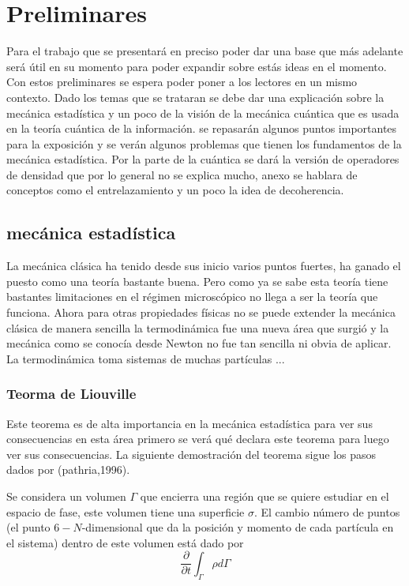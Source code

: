 \chapter{Preliminares}

Para el trabajo que se presentará en preciso poder dar una base que más adelante será útil  en su momento para poder expandir sobre estás ideas en el momento. Con estos preliminares se espera poder poner a los lectores en un mismo contexto. Dado los temas que se trataran se debe dar una explicación sobre la mecánica estadística y un poco de la visión de la mecánica cuántica que es usada en la teoría cuántica de la información. se repasarán algunos puntos importantes para la exposición y se verán algunos problemas que tienen los fundamentos de la mecánica estadística. Por la parte de la cuántica se dará la versión de operadores de densidad  que por lo general no se explica mucho, anexo se hablara de conceptos como el entrelazamiento y un poco la idea de decoherencia.

\section{mecánica estadística}
La mecánica clásica ha tenido desde sus inicio varios puntos fuertes, ha ganado el puesto como una teoría bastante buena. Pero como ya se sabe esta teoría tiene bastantes limitaciones en el régimen microscópico no llega a ser la teoría que funciona. Ahora para otras propiedades físicas no se puede extender la mecánica clásica de manera sencilla la termodinámica fue una nueva área que surgió y la mecánica como se conocía desde Newton no fue tan 
sencilla ni obvia de aplicar. La termodinámica toma sistemas de muchas partículas ...

\subsection{Teorma de Liouville }
Este teorema es de alta importancia en la mecánica estadística para ver sus consecuencias en esta área primero se verá qué declara este teorema para luego ver sus consecuencias. La siguiente demostración del teorema sigue los pasos dados por (pathria,1996). 

Se considera un volumen $\Gamma$ que encierra una región que se quiere estudiar en el espacio de fase,  este volumen tiene una superficie $\sigma$. El cambio número de puntos (el punto $6-N$-dimensional que da la posición y momento de cada partícula en el sistema) dentro de este volumen está dado por 
\begin{equation}
\frac{\partial}{\partial t} \int_{\Gamma} \rho d\Gamma
\end{equation}

